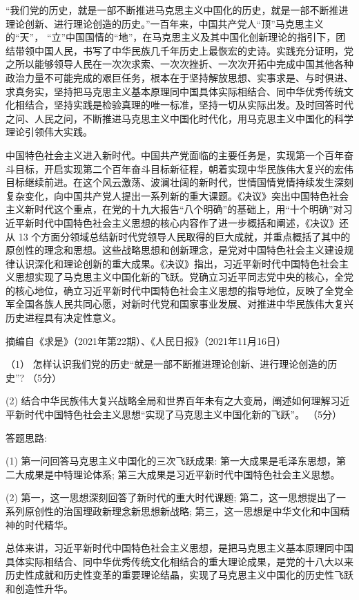 \documentclass[UTF8,11pt]{ctexart}
\begin{document}
“我们党的历史，就是一部不断推进马克思主义中国化的历史，就是一部不断推进理论创新、进行理论创造的历史。”一百年来，中国共产党人“顶”马克思主义的“天”， “立”中国国情的“地”，在马克思主义及其中国化创新理论的指引下，团结带领中国人民，书写了中华民族几千年历史上最恢宏的史诗。实践充分证明，党之所以能够领导人民在一次次求索、一次次挫折、一次次开拓中完成中国其他各种政治力量不可能完成的艰巨任务，根本在于坚持解放思想、实事求是、与时俱进、求真务实，坚持把马克思主义基本原理同中国具体实际相结合、同中华优秀传统文化相结合，坚持实践是检验真理的唯一标准，坚持一切从实际出发。及时回答时代之问、人民之问，不断推进马克思主义中国化时代化，用马克思主义中国化的科学理论引领伟大实践。

中国特色社会主义进入新时代。中国共产党面临的主要任务是，实现第一个百年奋斗目标，开启实现第二个百年奋斗目标新征程，朝着实现中华民族伟大复兴的宏伟目标继续前进。在这个风云激荡、波澜壮阔的新时代，世情国情党情持续发生深刻复杂变化，向中国共产党人提出一系列新的重大课题。《决议》突出中国特色社会主义新时代这个重点，在党的十九大报告“八个明确”的基础上，用“十个明确”对习近平新时代中国特色社会主义思想的核心内容作了进一步概括和阐述，《决议》还从 13 个方面分领域总结新时代党领导人民取得的巨大成就，并重点概括了其中的原创性的理念和思想。这些战略思想和创新理念，是党对中国特色社会主义建设规律认识深化和理论创新的重大成果。《决议》指出，习近平新时代中国特色社会主义思想实现了马克思主义中国化新的飞跃。党确立习近平同志党中央的核心，全党的核心地位，确立习近平新时代中国特色社会主义思想的指导地位，反映了全党全军全国各族人民共同心愿，对新时代党和国家事业发展、对推进中华民族伟大复兴历史进程具有决定性意义。

摘编自《求是》（2021年第22期）、《人民日报》（2021年11月16日）

（1） 怎样认识我们党的历史“就是一部不断推进理论创新、进行理论创造的历史”? （5分）

(2) 结合中华民族伟大复兴战略全局和世界百年未有之大变局，阐述如何理解习近平新时代中国特色社会主义思想“实现了马克思主义中国化新的飞跃”。 （5分）

答题思路:

(1) 第一问回答马克思主义中国化的三次飞跃成果: 第一大成果是毛泽东思想，第二大成果是中特理论体系; 第三大成果是习近平新时代中国特色社会主义思想。

(2) 第一，这一思想深刻回答了新时代的重大时代课题; 第二，这一思想提出了一系列原创性的治国理政新理念新思想新战略; 第三，这一思想是中华文化和中国精神的时代精华。

总体来讲，习近平新时代中国特色社会主义思想，是把马克思主义基本原理同中国具体实际相结合、同中华优秀传统文化相结合的重大理论成果，是党的十八大以来历史性成就和历史性变革的重要理论结晶，实现了马克思主义中国化的历史性飞跃和创造性升华。
\end{document}
